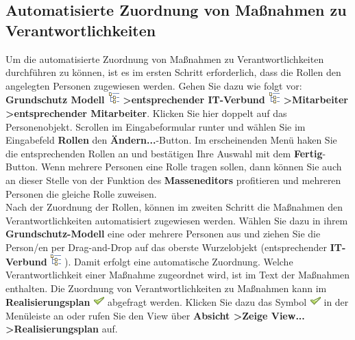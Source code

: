 \documentclass[a4paper,10pt]{book}
\begin{document}
\subsection{Automatisierte Zuordnung von Maßnahmen zu Verantwortlichkeiten}
Um die automatisierte Zuordnung von Maßnahmen zu Verantwortlichkeiten durchführen zu können, ist es im ersten Schritt erforderlich, dass die Rollen den angelegten Personen zugewiesen werden. Gehen Sie dazu wie folgt vor: \textbf{Grundschutz Modell \includegraphics[height=2ex]{Icon/GS_Modell.png} \textgreater entsprechender IT-Verbund \includegraphics[height=2ex]{Icon/GS_Modell.png} \textgreater Mitarbeiter \textgreater entsprechender Mitarbeiter}. Klicken Sie hier doppelt auf das Personenobjekt. Scrollen im Eingabeformular runter und wählen Sie im Eingabefeld \textbf{Rollen} den \textbf{Ändern...}-Button. Im erscheinenden Menü haken Sie die entsprechenden Rollen an und bestätigen Ihre Auswahl mit dem \textbf{Fertig}-Button. Wenn mehrere Personen eine Rolle tragen sollen, dann können Sie auch an dieser Stelle von der Funktion des \textbf{Masseneditors} profitieren und mehreren Personen die gleiche Rolle zuweisen.
\newline\\
Nach der Zuordnung der Rollen, können im zweiten Schritt die Maßnahmen den Verantwortlichkeiten automatisiert zugewiesen werden. Wählen Sie dazu in ihrem \textbf{Grundschutz-Modell} eine oder mehrere Personen aus und ziehen Sie die Person/en per Drag-and-Drop auf das oberste Wurzelobjekt (entsprechender \textbf{IT-Verbund} \includegraphics[height=2ex]{Icon/GS_Modell.png} ). Damit erfolgt eine automatische Zuordnung. Welche Verantwortlichkeit einer Maßnahme zugeordnet wird, ist im Text der Maßnahmen enthalten.
Die Zuordnung von Verantwortlichkeiten zu Maßnahmen kann im \textbf{Realisierungsplan} \includegraphics[height=2ex]{Icon/Okay.png} abgefragt werden. Klicken Sie dazu das Symbol \includegraphics[height=2ex]{Icon/Okay.png} in der Menüleiste an oder rufen Sie den View über \textbf{Absicht \textgreater Zeige View... \textgreater Realisierungsplan} auf.
\end{document}
